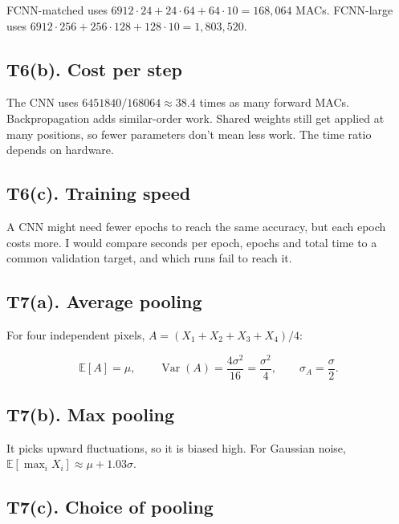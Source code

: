 \documentclass[11pt,a4paper]{article}
\begin{document}
FCNN-matched uses $6912\cdot24+24\cdot64+64\cdot10=168,064$ MACs. FCNN-large uses $6912\cdot256+256\cdot128+128\cdot10=1,803,520$.


\subsection*{T6(b). Cost per step}

The CNN uses $6451840/168064\approx38.4$ times as many forward MACs. Backpropagation adds similar-order work. Shared weights still get applied at many positions, so fewer parameters don't mean less work. The time ratio depends on hardware.


\subsection*{T6(c). Training speed}

A CNN might need fewer epochs to reach the same accuracy, but each epoch costs more. I would compare seconds per epoch, epochs and total time to a common validation target, and which runs fail to reach it.


\subsection*{T7(a). Average pooling}

For four independent pixels, $A=(X_1+X_2+X_3+X_4)/4$:

\[
\mathbb E[A]=\mu,\qquad\operatorname{Var}(A)=\frac{4\sigma^2}{16}=\frac{\sigma^2}{4},\qquad\sigma_A=\frac{\sigma}{2}.
\]


\subsection*{T7(b). Max pooling}

It picks upward fluctuations, so it is biased high. For Gaussian noise, $\mathbb E[\max_iX_i]\approx\mu+1.03\sigma$.


\subsection*{T7(c). Choice of pooling}
\end{document}
